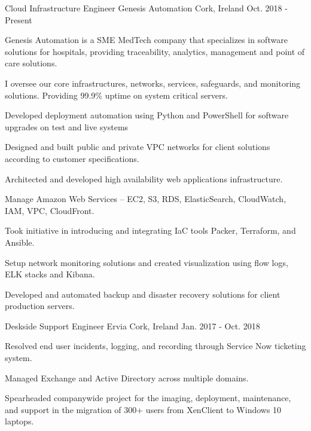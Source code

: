 


\begin{cventries}

\cventry
{Cloud Infrastructure Engineer}
{Genesis Automation}
{Cork, Ireland}
{Oct. 2018 - Present}
{
\begin{cvitems}
\item {Genesis Automation is a SME MedTech company that specializes in software solutions for hospitals, providing traceability, analytics, management and point of care solutions.}
\item {I oversee our core infrastructures, networks, services, safeguards, and monitoring solutions. Providing 99.9\% uptime on system critical servers.}
\item {Developed deployment automation using Python and PowerShell for software upgrades on test and live systems}
\item {Designed and built public and private VPC networks for client solutions according to customer specifications.}
\item {Architected and developed high availability web applications infrastructure.}
\item {Manage Amazon Web Services – EC2, S3, RDS, ElasticSearch, CloudWatch, IAM, VPC, CloudFront.}
\item {Took initiative in introducing and integrating IaC tools Packer, Terraform, and Ansible.}
\item {Setup network monitoring solutions and created visualization using flow logs, ELK stacks and Kibana.}
\item {Developed and automated backup and disaster recovery solutions for client production servers.}
\end{cvitems}
}


\cventry
{Deskside Support Engineer} %
{Ervia} %
{Cork, Ireland} %
{Jan. 2017 - Oct. 2018} %
{ %
\begin{cvitems}
\item {Resolved end user incidents, logging, and recording through Service Now ticketing system.}
\item {Managed Exchange and Active Directory across multiple domains.}
\item {Spearheaded companywide project for the imaging, deployment, maintenance, and support in the migration of 300+ users from XenClient to Windows 10 laptops.}
\end{cvitems}
}


\end{cventries}
